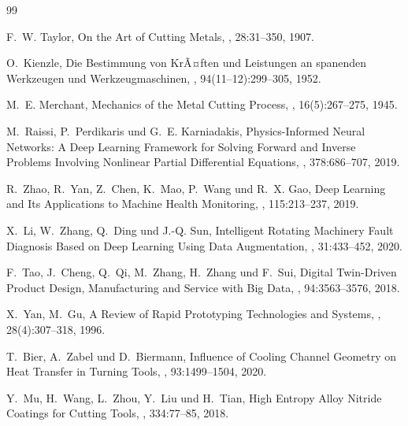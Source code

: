 ﻿\documentclass[a4paper,12pt]{article}
\theoremstyle{definition}
\begin{document}
\begin{thebibliography}{99}

F.~W. Taylor,
\newblock On the Art of Cutting Metals,
, 28:31--350, 1907.

O.~Kienzle,
\newblock Die Bestimmung von KrÃ¤ften und Leistungen an spanenden Werkzeugen und Werkzeugmaschinen,
, 94(11--12):299--305, 1952.

M.~E. Merchant,
\newblock Mechanics of the Metal Cutting Process,
, 16(5):267--275, 1945.

M.~Raissi, P.~Perdikaris und G.~E. Karniadakis,
\newblock Physics-Informed Neural Networks: A Deep Learning Framework for Solving
Forward and Inverse Problems Involving Nonlinear Partial Differential Equations,
, 378:686--707, 2019.

R.~Zhao, R.~Yan, Z.~Chen, K.~Mao, P.~Wang und R.~X. Gao,
\newblock Deep Learning and Its Applications to Machine Health Monitoring,
, 115:213--237, 2019.

X.~Li, W.~Zhang, Q.~Ding und J.-Q. Sun,
\newblock Intelligent Rotating Machinery Fault Diagnosis Based on Deep Learning
Using Data Augmentation,
, 31:433--452, 2020.

F.~Tao, J.~Cheng, Q.~Qi, M.~Zhang, H.~Zhang und F.~Sui,
\newblock Digital Twin-Driven Product Design, Manufacturing and Service with
Big Data,
,
94:3563--3576, 2018.

X.~Yan, M.~Gu,
\newblock A Review of Rapid Prototyping Technologies and Systems,
, 28(4):307--318, 1996.

T.~Bier, A.~Zabel und D.~Biermann,
\newblock Influence of Cooling Channel Geometry on Heat Transfer in Turning Tools,
, 93:1499--1504, 2020.

Y.~Mu, H.~Wang, L.~Zhou, Y.~Liu und H.~Tian,
\newblock High Entropy Alloy Nitride Coatings for Cutting Tools,
, 334:77--85, 2018.


\end{thebibliography}
\end{document}
